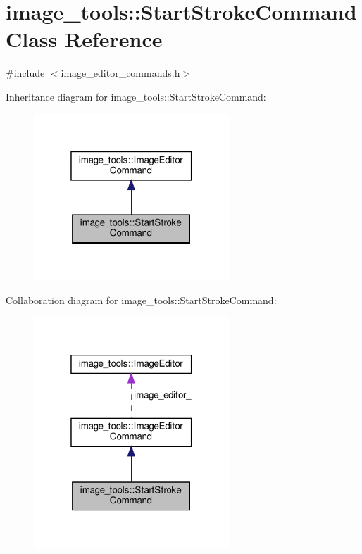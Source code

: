 \hypertarget{classimage__tools_1_1StartStrokeCommand}{}\section{image\+\_\+tools\+:\+:Start\+Stroke\+Command Class Reference}
\label{classimage__tools_1_1StartStrokeCommand}


{\ttfamily \#include $<$image\+\_\+editor\+\_\+commands.\+h$>$}



Inheritance diagram for image\+\_\+tools\+:\+:Start\+Stroke\+Command\+:
\nopagebreak
\begin{figure}[H]
\begin{center}
\leavevmode
\includegraphics[width=208pt]{classimage__tools_1_1StartStrokeCommand__inherit__graph}
\end{center}
\end{figure}


Collaboration diagram for image\+\_\+tools\+:\+:Start\+Stroke\+Command\+:
\nopagebreak
\begin{figure}[H]
\begin{center}
\leavevmode
\includegraphics[width=208pt]{classimage__tools_1_1StartStrokeCommand__coll__graph}
\end{center}
\end{figure}
